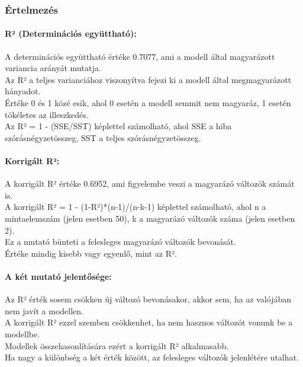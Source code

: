 \documentclass[11pt]{article}
\begin{document}
    \subsubsection{Értelmezés}\label{uxe9rtelmezuxe9s}

\paragraph{R² (Determinációs
együttható):}\label{ruxb2-determinuxe1ciuxf3s-egyuxfctthatuxf3}

A determinációs együttható értéke 0.7077, ami a modell által magyarázott
variancia arányát mutatja.\\
Az R² a teljes varianciához viszonyítva fejezi ki a modell által
megmagyarázott hányadot.\\
Értéke 0 és 1 közé esik, ahol 0 esetén a modell semmit nem magyaráz, 1
esetén tökéletes az illeszkedés.\\
Az R² = 1 - (SSE/SST) képlettel számolható, ahol SSE a hiba
szórásnégyzetösszeg, SST a teljes szórásnégyzetösszeg.

\paragraph{Korrigált R²:}\label{korriguxe1lt-ruxb2}

A korrigált R² értéke 0.6952, ami figyelembe veszi a magyarázó változók
számát is.\\
A korrigált R² = 1 - (1-R²)*(n-1)/(n-k-1) képlettel számolható, ahol n a
mintaelemszám (jelen esetben 50), k a magyarázó változók száma (jelen
esetben 2).\\
Ez a mutató bünteti a felesleges magyarázó változók bevonását.\\
Értéke mindig kisebb vagy egyenlő, mint az R².

\paragraph{A két mutató
jelentősége:}\label{a-kuxe9t-mutatuxf3-jelentux151suxe9ge}

Az R² érték sosem csökken új változó bevonásakor, akkor sem, ha az
valójában nem javít a modellen.\\
A korrigált R² ezzel szemben csökkenhet, ha nem hasznos változót vonunk
be a modellbe.\\
Modellek összehasonlítására ezért a korrigált R² alkalmasabb.\\
Ha nagy a különbség a két érték között, az felesleges változók
jelenlétére utalhat.
\end{document}
